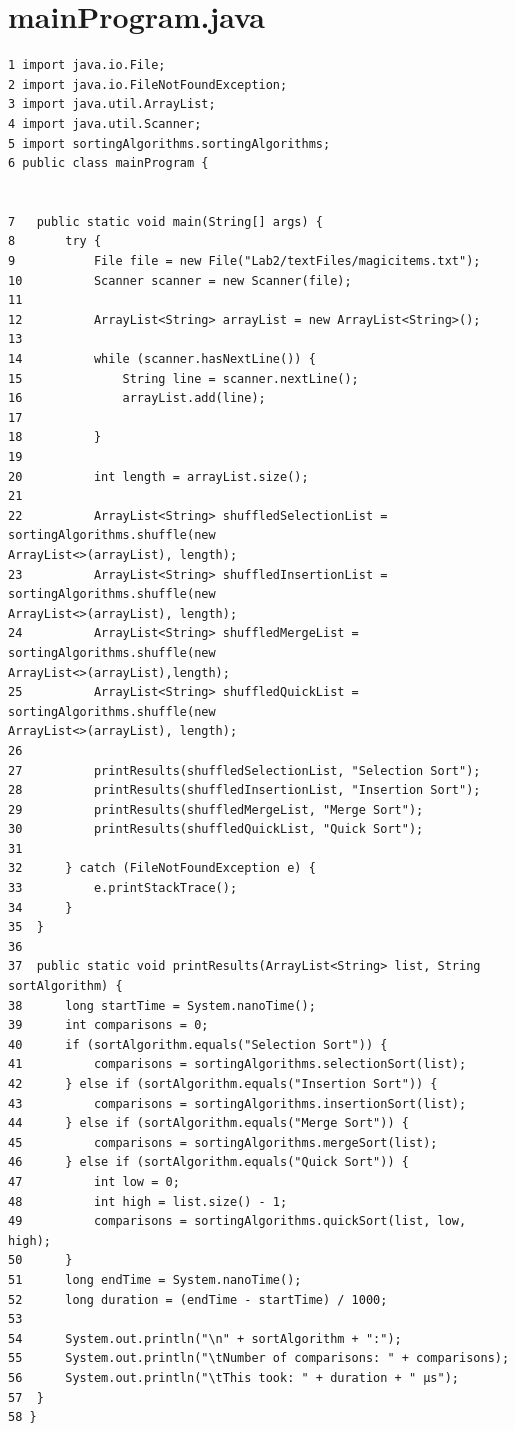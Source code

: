 \documentclass[a4paper,12pt]{article}
\begin{document}
\section{mainProgram.java}
\begin{verbatim}
1 import java.io.File;
2 import java.io.FileNotFoundException;
3 import java.util.ArrayList;
4 import java.util.Scanner;
5 import sortingAlgorithms.sortingAlgorithms;
6 public class mainProgram {


7   public static void main(String[] args) {
8       try {
9           File file = new File("Lab2/textFiles/magicitems.txt");
10          Scanner scanner = new Scanner(file);
11	
12          ArrayList<String> arrayList = new ArrayList<String>();
13	
14          while (scanner.hasNextLine()) {
15              String line = scanner.nextLine();
16              arrayList.add(line);
17
18          }
19	
20          int length = arrayList.size();
21	
22          ArrayList<String> shuffledSelectionList = sortingAlgorithms.shuffle(new 
ArrayList<>(arrayList), length);
23          ArrayList<String> shuffledInsertionList = sortingAlgorithms.shuffle(new 
ArrayList<>(arrayList), length);
24          ArrayList<String> shuffledMergeList = sortingAlgorithms.shuffle(new 
ArrayList<>(arrayList),length);
25          ArrayList<String> shuffledQuickList = sortingAlgorithms.shuffle(new 
ArrayList<>(arrayList), length);	
26		
27          printResults(shuffledSelectionList, "Selection Sort");
28          printResults(shuffledInsertionList, "Insertion Sort");
29          printResults(shuffledMergeList, "Merge Sort");
30          printResults(shuffledQuickList, "Quick Sort");			
31		
32      } catch (FileNotFoundException e) {
33          e.printStackTrace();
34      }
35  }
36	
37  public static void printResults(ArrayList<String> list, String sortAlgorithm) {
38      long startTime = System.nanoTime();
39      int comparisons = 0;
40      if (sortAlgorithm.equals("Selection Sort")) {
41          comparisons = sortingAlgorithms.selectionSort(list);
42      } else if (sortAlgorithm.equals("Insertion Sort")) {
43          comparisons = sortingAlgorithms.insertionSort(list);
44      } else if (sortAlgorithm.equals("Merge Sort")) {
45          comparisons = sortingAlgorithms.mergeSort(list);
46      } else if (sortAlgorithm.equals("Quick Sort")) {
47          int low = 0;
48          int high = list.size() - 1;
49          comparisons = sortingAlgorithms.quickSort(list, low, high);
50      }
51      long endTime = System.nanoTime();
52      long duration = (endTime - startTime) / 1000;
53
54      System.out.println("\n" + sortAlgorithm + ":");
55      System.out.println("\tNumber of comparisons: " + comparisons);
56      System.out.println("\tThis took: " + duration + " μs");
57  }	
58 }
\end{verbatim}
\end{document}
